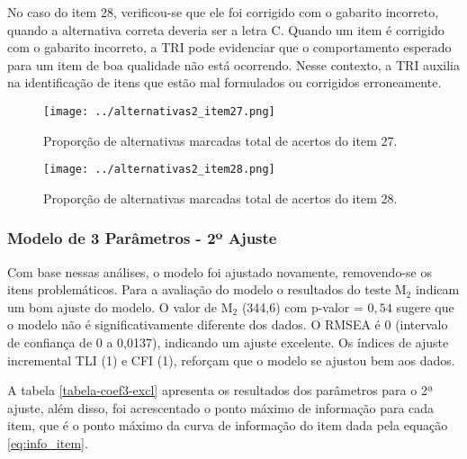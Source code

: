 No caso do item 28, verificou-se que ele foi corrigido com o gabarito incorreto, quando a alternativa correta deveria ser a letra C. Quando um item é corrigido com o gabarito incorreto, a TRI pode evidenciar que o comportamento esperado para um item de boa qualidade não está ocorrendo. Nesse contexto, a TRI auxilia na identificação de itens que estão mal formulados ou corrigidos erroneamente.

\begin{figure}[H]
	\centering
	\caption{Proporção de alternativas marcadas total de acertos do item 27.}
	\texttt{[image: ../alternativas2\_item27.png]}
	\parbox{\textwidth}{
		\centering %
	}
	\label{fig:item_27}
\end{figure}


\begin{figure}[H]
	\centering
	\caption{Proporção de alternativas marcadas total de acertos do item 28.}
	\texttt{[image: ../alternativas2\_item28.png]}
	\parbox{\textwidth}{
	\centering %
}	
	\label{fig:item_28}
\end{figure}




\subsubsection{Modelo de 3 Parâmetros - 2º Ajuste}

 Com base nessas análises, o modelo foi ajustado novamente, removendo-se os itens problemáticos. Para a avaliação do modelo o resultados do teste M$_2$ indicam um bom ajuste do modelo. O valor de M$_2$ (344,6) com p-valor = $0,54$ sugere que o modelo não é significativamente diferente dos dados. O RMSEA é 0 (intervalo de confiança de 0 a 0,0137), indicando um ajuste excelente. Os índices de ajuste incremental TLI (1) e CFI (1), reforçam que o modelo se ajustou bem aos dados.
 
 
  A tabela \ref{tabela-coef3-excl} apresenta os resultados dos parâmetros para o 2ª ajuste, além disso, foi acrescentado o ponto máximo de informação para cada item, que é o ponto máximo da curva de informação do item  dada pela equação \ref{eq:info_item}.


